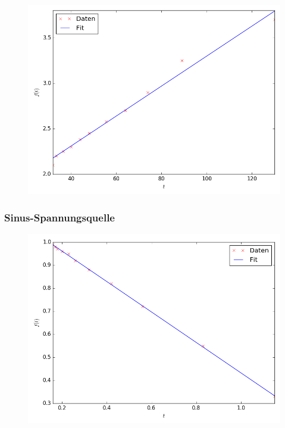\begin{figure}[H]
	\centering
	\caption{}
	\includegraphics[width=\linewidth-150pt,height=\textheight-150pt,keepaspectratio]{GleichstromR.png}
	\label{fig:GleichstromR}
\end{figure}


\newpage
\subsubsection{Sinus-Spannungsquelle}

\begin{figure}[H]
  \centering
  \caption{}
  \includegraphics[width=\linewidth-150pt,height=\textheight-150pt,keepaspectratio]{Sinus.png}
  \label{fig:Sinus}
\end{figure}


